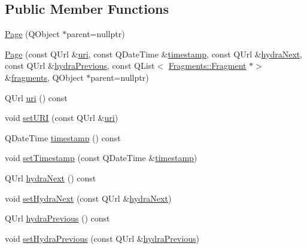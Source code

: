 \subsection*{Public Member Functions}
\begin{DoxyCompactItemize}
\item 
\mbox{\hyperlink{classFragments_1_1Page_af61cfda59ee42caa75e373471ac91ae6}{Page}} (Q\+Object $\ast$parent=nullptr)
\item 
\mbox{\hyperlink{classFragments_1_1Page_ac345c0f46af8796c9f7fa702f71f240c}{Page}} (const Q\+Url \&\mbox{\hyperlink{classFragments_1_1Page_a1185c1fb78c1d28eee03dba926fefcb8}{uri}}, const Q\+Date\+Time \&\mbox{\hyperlink{classFragments_1_1Page_a44cf4faf8776d3344bc4296d37b1f7ae}{timestamp}}, const Q\+Url \&\mbox{\hyperlink{classFragments_1_1Page_a822bbc500bf1e5540582cdf258d73b20}{hydra\+Next}}, const Q\+Url \&\mbox{\hyperlink{classFragments_1_1Page_a102aada029299dbe7f8b55116eda0933}{hydra\+Previous}}, const Q\+List$<$ \mbox{\hyperlink{classFragments_1_1Fragment}{Fragments\+::\+Fragment}} $\ast$$>$ \&\mbox{\hyperlink{classFragments_1_1Page_ab2460084209c3fe9211f70689ad78019}{fragments}}, Q\+Object $\ast$parent=nullptr)
\item 
Q\+Url \mbox{\hyperlink{classFragments_1_1Page_a1185c1fb78c1d28eee03dba926fefcb8}{uri}} () const
\item 
void \mbox{\hyperlink{classFragments_1_1Page_a13d34067ae20ee41b3003a6c2084fe2c}{set\+U\+RI}} (const Q\+Url \&\mbox{\hyperlink{classFragments_1_1Page_a1185c1fb78c1d28eee03dba926fefcb8}{uri}})
\item 
Q\+Date\+Time \mbox{\hyperlink{classFragments_1_1Page_a44cf4faf8776d3344bc4296d37b1f7ae}{timestamp}} () const
\item 
void \mbox{\hyperlink{classFragments_1_1Page_a5f771039432d7c46a7da56d34474bb8a}{set\+Timestamp}} (const Q\+Date\+Time \&\mbox{\hyperlink{classFragments_1_1Page_a44cf4faf8776d3344bc4296d37b1f7ae}{timestamp}})
\item 
Q\+Url \mbox{\hyperlink{classFragments_1_1Page_a822bbc500bf1e5540582cdf258d73b20}{hydra\+Next}} () const
\item 
void \mbox{\hyperlink{classFragments_1_1Page_a241195084d7c53ce0c8ad2fff67d9698}{set\+Hydra\+Next}} (const Q\+Url \&\mbox{\hyperlink{classFragments_1_1Page_a822bbc500bf1e5540582cdf258d73b20}{hydra\+Next}})
\item 
Q\+Url \mbox{\hyperlink{classFragments_1_1Page_a102aada029299dbe7f8b55116eda0933}{hydra\+Previous}} () const
\item 
void \mbox{\hyperlink{classFragments_1_1Page_a262f978bd4837db5e1c50b59a7984608}{set\+Hydra\+Previous}} (const Q\+Url \&\mbox{\hyperlink{classFragments_1_1Page_a102aada029299dbe7f8b55116eda0933}{hydra\+Previous}})
$$
\end{DoxyCompactItemize}
